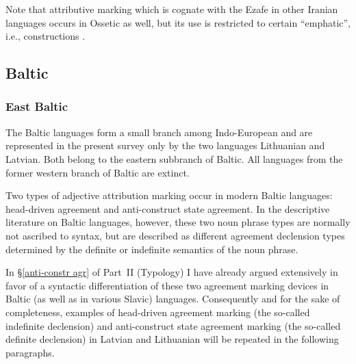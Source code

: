 Note that attributive  marking which is cognate with the Ezafe in other Iranian languages occurs in Ossetic as well, but its use is restricted to certain “emphatic”, i.e.,  constructions \cite[467]{thodarson1989}.

\subsection{Baltic}
\label{baltic synchr}
\subsubsection{East Baltic}
The Baltic languages form a small branch among Indo-European and are represented in the present survey only by the two languages Lithuanian and Latvian. Both belong to the eastern subbranch of Baltic. All languages from the former western branch of Baltic are extinct.

Two types of adjective attribution marking occur in modern Baltic languages: head\hyp{}driven agreement and anti\hyp{}construct state agreement. In the descriptive literature on Baltic languages, however, these two noun phrase types are normally not ascribed to syntax, but are described as different agreement declension types determined by the definite or indefinite semantics of the noun phrase.

In \S\ref{anti-constr agr} of Part~II (Typology) I have already argued extensively in favor of a syntactic differentiation of these two agreement marking devices in Baltic (as well as in various Slavic) languages. Consequently and for the sake of completeness, examples of head\hyp{}driven agreement marking (the so-called indefinite declension) and anti\hyp{}construct state agreement marking (the so-called definite declension) in Latvian and Lithuanian will be repeated in the following paragraphs.

